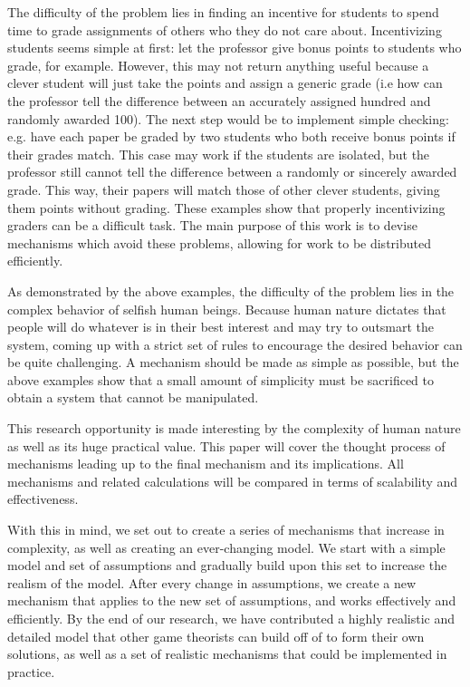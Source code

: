 \documentclass[12pt, Arial]{article}
\begin{document}
The difficulty of the problem lies in finding an incentive for students to spend time to grade assignments of others who they do not care about. Incentivizing students seems simple at first: let the professor give bonus points to students who grade, for example. However, this may not return anything useful because a clever student will just take the points and assign a generic grade (i.e how can the professor tell the difference between an accurately assigned hundred and randomly awarded 100). The next step would be to implement simple checking: e.g. have each paper be graded by two students who both receive bonus points if their grades match. This case may work if the students are isolated, but the professor still cannot tell the difference between a randomly or sincerely awarded grade. This way, their papers will match those of other clever students, giving them points without grading. These examples show that properly incentivizing graders can be a difficult task. The main purpose of this work is to devise mechanisms which avoid these problems, allowing for work to be distributed efficiently.

As demonstrated by the above examples, the difficulty of the problem lies in the complex behavior of selfish human beings. Because human nature dictates that people will do whatever is in their best interest and may try to outsmart the system, coming up with a strict set of rules to encourage the desired behavior can be quite challenging. A mechanism should be made as simple as possible, but the above examples show that a small amount of simplicity must be sacrificed to obtain a system that cannot be manipulated.

This research opportunity is made interesting by the complexity of human nature as well as its huge practical value. This paper will cover the thought process of mechanisms leading up to the final mechanism and its implications. All mechanisms and related calculations will be compared in terms of scalability and effectiveness.

With this in mind, we set out to create a series of mechanisms that increase in complexity, as well as creating an ever-changing model. We start with a simple model and set of assumptions and gradually build upon this set to increase the realism of the model. After every change in assumptions, we create a new mechanism that applies to the new set of assumptions, and works effectively and efficiently. By the end of our research, we have contributed a highly realistic and detailed model that other game theorists can build off of to form their own solutions, as well as a set of realistic mechanisms that could be implemented in practice.
\end{document}
